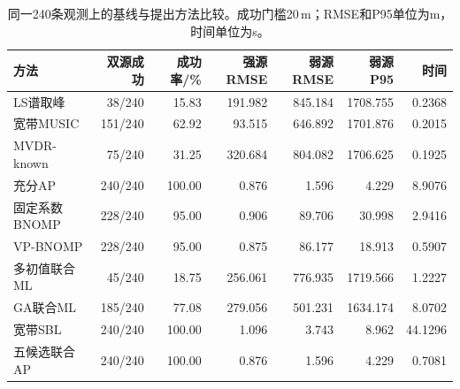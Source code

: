 \begin{table}[H]\centering\small
\caption{同一240条观测上的基线与提出方法比较。成功门槛20\,m；RMSE和P95单位为m，时间单位为s。}\label{tab:formalcommon}
\begin{tabular}{@{}lrrrrrr@{}}\toprule
方法 & 双源成功 & 成功率/\% & 强源RMSE & 弱源RMSE & 弱源P95 & 时间\\\midrule
LS谱取峰 & 38/240 & 15.83 & 191.982 & 845.184 & 1708.755 & 0.2368\\
宽带MUSIC & 151/240 & 62.92 & 93.515 & 646.892 & 1701.876 & 0.2015\\
MVDR-known & 75/240 & 31.25 & 320.684 & 804.082 & 1706.625 & 0.1925\\
充分AP & 240/240 & 100.00 & 0.876 & 1.596 & 4.229 & 8.9076\\
固定系数BNOMP & 228/240 & 95.00 & 0.906 & 89.706 & 30.998 & 2.9416\\
VP-BNOMP & 228/240 & 95.00 & 0.875 & 86.177 & 18.913 & 0.5907\\
多初值联合ML & 45/240 & 18.75 & 256.061 & 776.935 & 1719.566 & 1.2227\\
GA联合ML & 185/240 & 77.08 & 279.056 & 501.231 & 1634.174 & 8.0702\\
宽带SBL & 240/240 & 100.00 & 1.096 & 3.743 & 8.962 & 44.1296\\
五候选联合AP & 240/240 & 100.00 & 0.876 & 1.596 & 4.229 & 0.7081\\
\bottomrule\end{tabular}\end{table}
